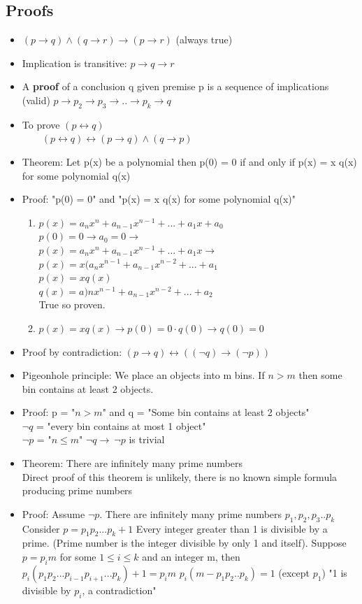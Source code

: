 \documentclass[9pt, letterpaper, oneside]{article}
\begin{document}
\subsection{Proofs}
\begin{itemize}
	\item $(p \to q) \wedge (q \to r) \to (p \to r)$ (always true)
	\item Implication is transitive: $p \to q \to r$
	\item A \textbf{proof} of a conclusion q given premise p is a sequence of implications (valid) $p \to p_2 \to p_3 \to .. \to p_k \to q$
	\item To prove $(p \leftrightarrow q)$ \\
		$\qquad (p \leftrightarrow q) \leftrightarrow (p \to q) \wedge (q \to p)$
	\item Theorem: Let p(x) be a polynomial then p(0) = 0 if and only if p(x) = x q(x) for some polynomial q(x)
	\item Proof: "p(0) = 0" and "p(x) = x q(x) for some polynomial q(x)"
	\begin{enumerate}
		\item $p(x) = a_nx^n + a_{n -1}x^{n-1} + ... + a_1x + a_0$ \\
			$p(0) = 0 \to a_0 = 0 \to$ \\
			$p(x) = a_nx^n + a_{n -1}x^{n-1} + ... + a_1x \to$ \\
			$p(x) = x(a_nx^{n-1} + a_{n -1}x^{n-2} + ... + a_1$ \\
			$p(x) = xq(x)$ \\
			$q(x) = a)nx^{n-1} + a_{n-1}x^{n-2} + ... + a_2$ \\
			True so proven.
		\item $p(x) = x q(x) \to p(0) = 0 \cdot q(0) \to q(0) = 0$
	\end{enumerate}
	\item Proof by contradiction: $(p \to q) \leftrightarrow ((\neg q)\to (\neg p))$
	\item Pigeonhole principle: We place an objects into m bins. If $n > m$ then some bin contains at least 2 objects.
	\item Proof: p = "$n > m$" and q = "Some bin contains at least 2 objects" \\
	$\neg q$ = "every bin contains at most 1 object" \\
	$\neg p$ = "$n \leq m$"
	$\neg q \to\ \neg p$ is trivial
	\item Theorem: There are infinitely many prime numbers \\
		Direct proof of this theorem is unlikely, there is no known simple formula producing prime numbers
	\item Proof: Assume $\neg p$. There are infinitely many prime numbers $p_1, p_2, p_3 .. p_k$ \\
	Consider $p = p_1p_2...p_k + 1$
	Every integer greater than 1 is divisible by a prime. (Prime number is the integer divisible by only 1 and itself).
	Suppose $p = p_im$ for some $1 \leq i \leq k$ and an integer m, then $p_i(p_1p_2...p_{i-1}p_{i+1}...p_k) + 1 = p_im$
	$p_i(m - p_1p_2..p_k) = 1$ (except $p_1$)
	"1 is divisible by $p_i$, a contradiction"
\end{itemize}
\end{document}
